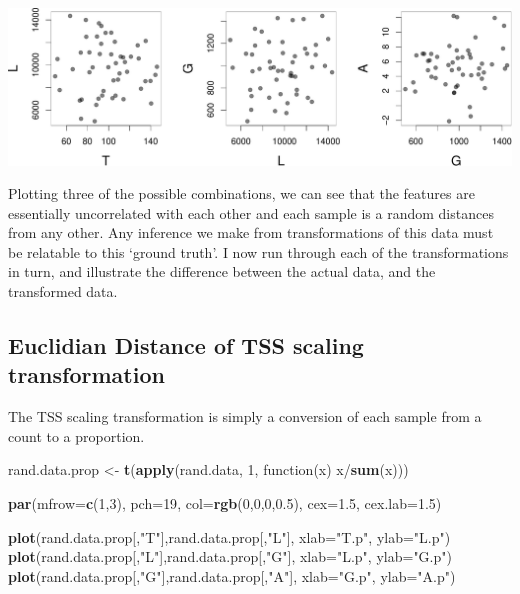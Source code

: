 \documentclass[twocolumn]{article}
\newenvironment{Shaded}{\begin{snugshade}}{\end{snugshade}}
\newcommand{\KeywordTok}[1]{\textcolor[rgb]{0.13,0.29,0.53}{\textbf{{#1}}}}
\newcommand{\DataTypeTok}[1]{\textcolor[rgb]{0.13,0.29,0.53}{{#1}}}
\newcommand{\DecValTok}[1]{\textcolor[rgb]{0.00,0.00,0.81}{{#1}}}
\newcommand{\FloatTok}[1]{\textcolor[rgb]{0.00,0.00,0.81}{{#1}}}
\newcommand{\StringTok}[1]{\textcolor[rgb]{0.31,0.60,0.02}{{#1}}}
\newcommand{\NormalTok}[1]{{#1}}
\begin{document}
\includegraphics{main_files/figure-latex/R_block_random-1.pdf}

Plotting three of the possible combinations, we can see that the
features are essentially uncorrelated with each other and each sample is
a random distances from any other. Any inference we make from
transformations of this data must be relatable to this `ground truth'. I
now run through each of the transformations in turn, and illustrate the
difference between the actual data, and the transformed data.

\subsection{Euclidian Distance of TSS scaling transformation}

The TSS scaling transformation is simply a conversion of each sample
from a count to a proportion.

\begin{Shaded}
\begin{Highlighting}[]
\NormalTok{rand.data.prop <-}\StringTok{ }\KeywordTok{t}\NormalTok{(}\KeywordTok{apply}\NormalTok{(rand.data, }\DecValTok{1}\NormalTok{,}
    \NormalTok{function(x) x/}\KeywordTok{sum}\NormalTok{(x)))}

\KeywordTok{par}\NormalTok{(}\DataTypeTok{mfrow=}\KeywordTok{c}\NormalTok{(}\DecValTok{1}\NormalTok{,}\DecValTok{3}\NormalTok{), }\DataTypeTok{pch=}\DecValTok{19}\NormalTok{, }\DataTypeTok{col=}\KeywordTok{rgb}\NormalTok{(}\DecValTok{0}\NormalTok{,}\DecValTok{0}\NormalTok{,}\DecValTok{0}\NormalTok{,}\FloatTok{0.5}\NormalTok{),}
    \DataTypeTok{cex=}\FloatTok{1.5}\NormalTok{, }\DataTypeTok{cex.lab=}\FloatTok{1.5}\NormalTok{)}

\KeywordTok{plot}\NormalTok{(rand.data.prop[,}\StringTok{"T"}\NormalTok{],rand.data.prop[,}\StringTok{"L"}\NormalTok{],}
    \DataTypeTok{xlab=}\StringTok{"T.p"}\NormalTok{, }\DataTypeTok{ylab=}\StringTok{"L.p"}\NormalTok{)}
\KeywordTok{plot}\NormalTok{(rand.data.prop[,}\StringTok{"L"}\NormalTok{],rand.data.prop[,}\StringTok{"G"}\NormalTok{],}
    \DataTypeTok{xlab=}\StringTok{"L.p"}\NormalTok{, }\DataTypeTok{ylab=}\StringTok{"G.p"}\NormalTok{)}
\KeywordTok{plot}\NormalTok{(rand.data.prop[,}\StringTok{"G"}\NormalTok{],rand.data.prop[,}\StringTok{"A"}\NormalTok{],}
    \DataTypeTok{xlab=}\StringTok{"G.p"}\NormalTok{, }\DataTypeTok{ylab=}\StringTok{"A.p"}\NormalTok{)}
\end{Highlighting}
\end{Shaded}
\end{document}
